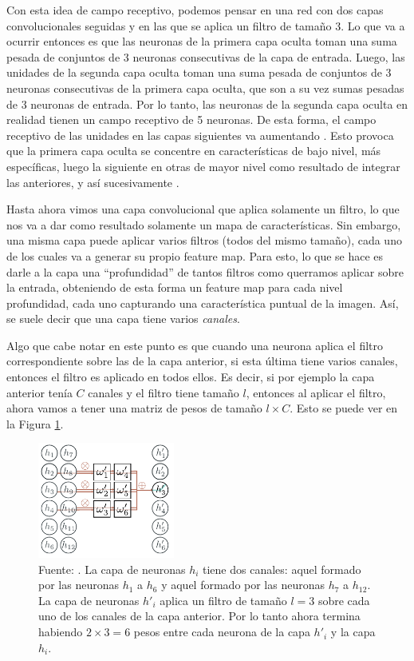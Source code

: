 \documentclass[../../main.tex]{subfiles}
\begin{document}
Con esta idea de campo receptivo, podemos pensar en una red con dos capas convolucionales
seguidas y en las que se aplica un filtro de tamaño 3. Lo que va a ocurrir entonces es que
las neuronas de la primera capa oculta toman una suma pesada de conjuntos de 3 neuronas
consecutivas de la capa de entrada. Luego, las unidades de la segunda capa oculta toman
una suma pesada de conjuntos de 3 neuronas consecutivas de la primera capa oculta, que son
a su vez sumas pesadas de 3 neuronas de entrada. Por lo tanto, las neuronas de la segunda
capa oculta en realidad tienen un campo receptivo de 5 neuronas. De esta forma, el campo
receptivo de las unidades en las capas siguientes va aumentando \cite{prince2024understanding}.
Esto provoca que la primera capa oculta se concentre en características de bajo nivel,
más específicas, luego la siguiente en otras de mayor nivel como resultado de integrar
las anteriores, y así sucesivamente \cite{hands-on-ML-sklearn-tf}.

Hasta ahora vimos una capa convolucional que aplica solamente un filtro, lo que nos va a
dar como resultado solamente un mapa de características. Sin embargo, una misma capa puede
aplicar varios filtros (todos del mismo tamaño), cada uno de los cuales va a generar su
propio feature map. Para esto, lo que se hace es darle a la capa una ``profundidad'' de
tantos filtros como querramos aplicar sobre la entrada, obteniendo de esta forma un feature
map para cada nivel profundidad, cada uno capturando una característica puntual de la imagen.
Así, se suele decir que una capa tiene varios \textit{canales}.

Algo que cabe notar en este punto es que cuando una neurona aplica el filtro
correspondiente sobre las de la capa anterior, si esta última tiene varios canales,
entonces el filtro es aplicado en todos ellos. Es decir, si por ejemplo la capa anterior
tenía \(C\) canales y el filtro tiene tamaño \(l\), entonces al aplicar el filtro, ahora
vamos a tener una matriz de pesos de tamaño \(l \times C\). Esto se puede ver en la
Figura \ref{fig:conv-layer-multi-channel}.

\begin{figure}
    \centering
    \includegraphics[width=0.4\textwidth]{figs/conv-layer-multi-channel.png}
    \caption{Fuente: \cite{prince2024understanding}. La capa de neuronas \(h_i\) tiene
    dos canales: aquel formado por las neuronas \(h_1\) a \(h_6\) y aquel formado
    por las neuronas \(h_7\) a \(h_{12}\). La capa de neuronas \(h'_i\) aplica un
    filtro de tamaño \(l=3\) sobre cada uno de los canales de la capa anterior. Por
    lo tanto ahora termina habiendo \(2 \times 3 = 6\) pesos entre cada neurona de la
    capa \(h'_i\) y la capa \(h_i\).}
    \label{fig:conv-layer-multi-channel}
\end{figure}
\end{document}

